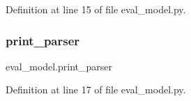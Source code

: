 Definition at line 15 of file eval\+\_\+model.\+py.

\mbox{\label{namespaceeval__model_a09dddb88f4842a88e26a0961b1c8a5e3}} 
\subsubsection{\texorpdfstring{print\+\_\+parser}{print\_parser}}
{\footnotesize\ttfamily eval\+\_\+model.\+print\+\_\+parser}



Definition at line 17 of file eval\+\_\+model.\+py.

